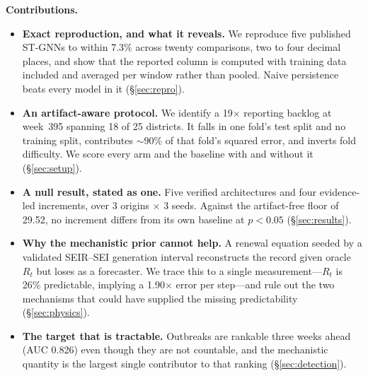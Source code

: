 \noindent\textbf{Contributions.}
\begin{itemize}\itemsep2pt
  \item \textbf{Exact reproduction, and what it reveals.} We reproduce five
        published ST-GNNs to within 7.3\% across twenty comparisons, two to four
        decimal places, and show that the reported column is computed with
        training data included and averaged per window rather than pooled. Naive
        persistence beats every model in it (\S\ref{sec:repro}).
  \item \textbf{An artifact-aware protocol.} We identify a 19$\times$ reporting
        backlog at week~395 spanning 18 of 25 districts. It falls in one fold's
        test split and no training split, contributes $\sim$90\% of that fold's
        squared error, and inverts fold difficulty. We score every arm and the
        baseline with and without it (\S\ref{sec:setup}).
  \item \textbf{A null result, stated as one.} Five verified architectures and
        four evidence-led increments, over 3 origins $\times$ 3 seeds. Against the
        artifact-free floor of 29.52, no increment differs from its own baseline
        at $p<0.05$ (\S\ref{sec:results}).
  \item \textbf{Why the mechanistic prior cannot help.} A renewal equation seeded
        by a validated SEIR--SEI generation interval reconstructs the record given
        oracle $R_t$ but loses as a forecaster. We trace this to a single
        measurement---$R_t$ is 26\% predictable, implying a 1.90$\times$ error per
        step---and rule out the two mechanisms that could have supplied the
        missing predictability (\S\ref{sec:physics}).
  \item \textbf{The target that is tractable.} Outbreaks are rankable three weeks
        ahead (AUC 0.826) even though they are not countable, and the mechanistic
        quantity is the largest single contributor to that ranking
        (\S\ref{sec:detection}).
\end{itemize}
